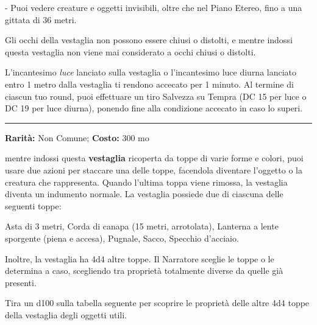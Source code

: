 \begin{multicols}{2}
- Puoi vedere creature e oggetti invisibili, oltre che nel Piano Etereo, fino a una gittata di 36 metri.

Gli occhi della vestaglia non possono essere chiusi o distolti, e mentre indossi questa vestaglia non viene mai considerato a occhi chiusi o distolti.

L'incantesimo \emph{luce} lanciato sulla vestaglia o l'incantesimo luce diurna lanciato entro 1 metro dalla vestaglia ti rendono accecato per 1 minuto. Al termine di ciascun tuo round, puoi effettuare un tiro Salvezza su Tempra (DC 15 per luce o DC 19 per luce diurna), ponendo fine alla condizione accecato in caso lo superi.

\smallskip\noindent\rule{\linewidth}{2pt}  \hypertarget{TunicadegliOggettiUtili}{}\medskip{}\noindent\label{TunicadegliOggettiUtili}

\textbf{Rarità:} Non Comune; \textbf{Costo:} 300 mo

mentre indossi questa \textbf{vestaglia} ricoperta da toppe di varie forme e colori, puoi usare due azioni per staccare una delle toppe, facendola diventare l'oggetto o la creatura che rappresenta. Quando l'ultima toppa viene rimossa, la vestaglia diventa un indumento normale. La vestaglia possiede due di ciascuna delle seguenti toppe:

Asta di 3 metri, Corda di canapa (15 metri, arrotolata), Lanterna a lente sporgente (piena e accesa), Pugnale, Sacco, Specchio d'acciaio.

Inoltre, la vestaglia ha 4d4 altre toppe. Il Narratore sceglie le toppe o le determina a caso, scegliendo tra proprietà totalmente diverse da quelle già presenti.

Tira un d100 sulla tabella seguente per scoprire le proprietà delle altre 4d4 toppe della vestaglia degli oggetti utili.


\medskip


\end{multicols}

